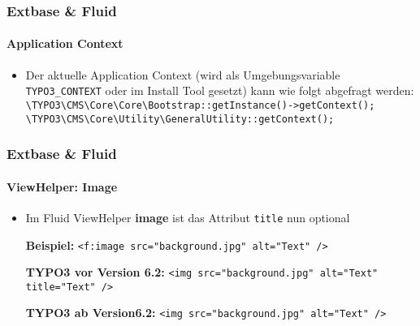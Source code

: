 
\begin{frame}[fragile]
	\frametitle{Extbase \& Fluid}
	\framesubtitle{Application Context}

	\begin{itemize}
		\item Der aktuelle Application Context (wird als Umgebungsvariable
			\texttt{TYPO3\_CONTEXT} oder im Install Tool gesetzt) kann wie folgt
			abgefragt werden:\newline\newline
			\lstinline!\TYPO3\CMS\Core\Core\Bootstrap::getInstance()->getContext();!
			\lstinline!\TYPO3\CMS\Core\Utility\GeneralUtility::getContext();!

	\end{itemize}

\end{frame}


\begin{frame}[fragile]
	\frametitle{Extbase \& Fluid}
	\framesubtitle{ViewHelper: Image}

	\begin{itemize}
		\item Im Fluid ViewHelper \textbf{image} ist das Attribut \texttt{title} nun  optional\newline

			\smaller\textbf{Beispiel:}\normalsize\newline
			\lstinline!<f:image src="background.jpg" alt="Text" />!
			\newline

			\smaller\textbf{TYPO3 vor Version 6.2:}\normalsize\newline
			\lstinline!<img src="background.jpg" alt="Text" title="Text" />!
			\newline

			\smaller\textbf{TYPO3 ab Version6.2:}\normalsize\newline
			\lstinline!<img src="background.jpg" alt="Text" />!

	\end{itemize}

\end{frame}

